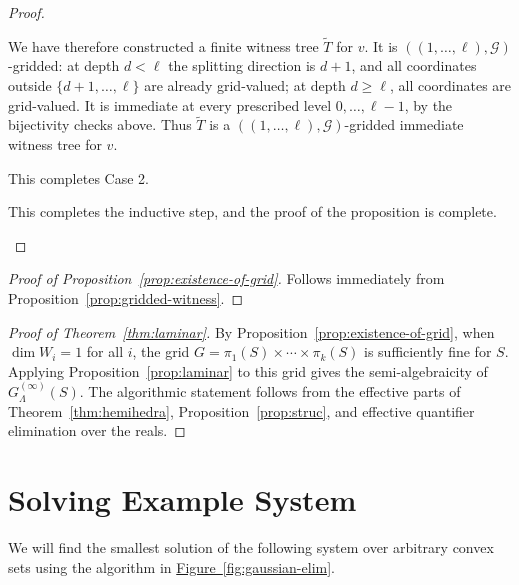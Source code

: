 \documentclass[10pt]{amsart}
\theoremstyle{plain}
\theoremstyle{definition}
\providecommand{\namedref}[2]{\hyperref[#2]{#1~\ref*{#2}}\xspace}
\providecommand{\figureref}[1]{\namedref{Figure}{fig:#1}}
\providecommand{\cG}[0]{\ensuremath{\mathcal G}\xspace}
\let\geq\geqslant
\begin{document}
\begin{proof}
\begin{enumerate}[1.]
\begin{enumerate}
We have therefore constructed a finite witness tree \(\widetilde{T}\) for \(v\). It is
\(((1,\ldots,\ell),\mathcal G)\)-gridded: at depth \(d<\ell\) the splitting direction is
\(d+1\), and all coordinates outside \(\{d+1,\ldots,\ell\}\) are already grid-valued; at
depth \(d\geq\ell\), all coordinates are grid-valued.  It is immediate at every prescribed
level \(0,\ldots,\ell-1\), by the bijectivity checks above.  Thus \(\widetilde{T}\) is a
\(((1,\ldots,\ell),\cG)\)-gridded immediate witness tree for \(v\).

This completes Case 2.
\end{enumerate}
This completes the inductive step, and the proof of the proposition is complete. 
\end{enumerate}
\end{proof}




\begin{proof}[Proof of Proposition~\ref{prop:existence-of-grid}]
   Follows immediately from Proposition~\ref{prop:gridded-witness}. 
\end{proof}





\begin{proof}[Proof of Theorem~\ref{thm:laminar}]
By Proposition~\ref{prop:existence-of-grid}, when \(\dim W_i=1\) for all \(i\), the grid
\(G=\pi_1(S)\times\cdots\times\pi_k(S)\) is sufficiently fine for \(S\).
Applying Proposition~\ref{prop:laminar} to this grid gives the semi-algebraicity of
\(G_\Lambda^{(\infty)}(S)\). The algorithmic statement follows from the
effective parts of Theorem~\ref{thm:hemihedra}, Proposition~\ref{prop:struc}, and effective quantifier elimination over the reals.
\end{proof}



\section{Solving Example System}
\label{sec:example}

We will find the smallest solution of the following system over arbitrary convex sets using the algorithm in \figureref{gaussian-elim}.
\end{document}
